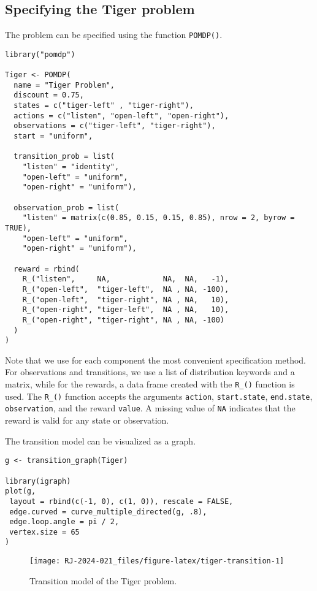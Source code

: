 \subsection{Specifying the Tiger problem}\label{specifying-the-tiger-problem}

The problem can be specified using the function \texttt{POMDP()}.

\begin{verbatim}
library("pomdp")

Tiger <- POMDP(
  name = "Tiger Problem",
  discount = 0.75,
  states = c("tiger-left" , "tiger-right"),
  actions = c("listen", "open-left", "open-right"),
  observations = c("tiger-left", "tiger-right"),
  start = "uniform",
  
  transition_prob = list(
    "listen" = "identity", 
    "open-left" = "uniform", 
    "open-right" = "uniform"),

  observation_prob = list(
    "listen" = matrix(c(0.85, 0.15, 0.15, 0.85), nrow = 2, byrow = TRUE), 
    "open-left" = "uniform",
    "open-right" = "uniform"),
    
  reward = rbind(
    R_("listen",     NA,            NA,  NA,   -1),
    R_("open-left",  "tiger-left",  NA , NA, -100),
    R_("open-left",  "tiger-right", NA , NA,   10),
    R_("open-right", "tiger-left",  NA , NA,   10),
    R_("open-right", "tiger-right", NA , NA, -100)
  )
)
\end{verbatim}

Note that we use for each component the most convenient specification method. For observations and transitions, we use a
list of distribution keywords and a matrix, while for the rewards, a data frame created with the \texttt{R\_()} function is used.
The \texttt{R\_()} function accepts the arguments \texttt{action},
\texttt{start.state}, \texttt{end.state},
\texttt{observation}, and the reward \texttt{value}.
A missing value of \texttt{NA} indicates that the reward is valid for any
state or observation.

The transition model can be visualized as a graph.

\begin{verbatim}
g <- transition_graph(Tiger)

library(igraph)
plot(g,
 layout = rbind(c(-1, 0), c(1, 0)), rescale = FALSE,
 edge.curved = curve_multiple_directed(g, .8),
 edge.loop.angle = pi / 2,
 vertex.size = 65
)
\end{verbatim}

\begin{figure}
\texttt{[image: RJ-2024-021\_files/figure-latex/tiger-transition-1]} \caption{Transition model of the Tiger problem.}\label{fig:tiger-transition}
\end{figure}

